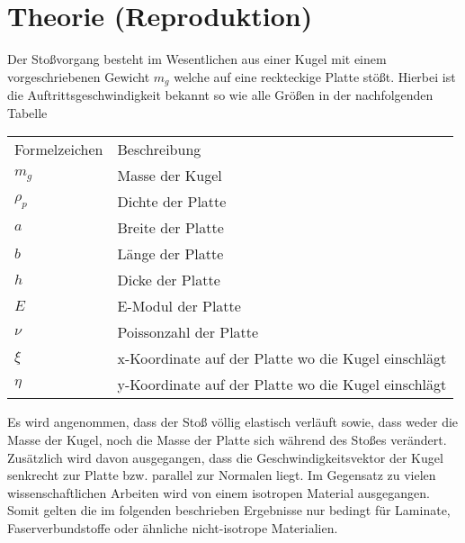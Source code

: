 \chapter{Theorie (Reproduktion)}
\label{chap:Principles}

Der Stoßvorgang besteht im Wesentlichen aus einer Kugel mit einem vorgeschriebenen Gewicht $m_g$ welche auf eine reckteckige Platte stößt. Hierbei ist die Auftrittsgeschwindigkeit bekannt so wie alle Größen in der nachfolgenden Tabelle

\begin{center}
\begin{tabular}[h]{l | l}	
	Formelzeichen & Beschreibung \\
	$m_g$ & Masse der Kugel \\
	$\rho_p$ & Dichte der Platte\\
	$a$ & Breite der Platte\\
	$b$ & Länge der Platte\\
	$h$ & Dicke der Platte \\
	$E$ & E-Modul der Platte \\
	$\nu$ & Poissonzahl der Platte \\
	$\xi$ & x-Koordinate auf der Platte wo die Kugel einschlägt \\
	$\eta$ & y-Koordinate auf der Platte wo die Kugel einschlägt \\
\end{tabular}
\end{center}

Es wird angenommen, dass der Stoß völlig elastisch verläuft sowie, dass weder die Masse der Kugel, noch die Masse der Platte sich während des Stoßes verändert.
Zusätzlich wird davon ausgegangen, dass die Geschwindigkeitsvektor der Kugel senkrecht zur Platte bzw. parallel zur Normalen liegt. Im Gegensatz zu vielen wissenschaftlichen Arbeiten wird von einem isotropen Material ausgegangen. Somit gelten die im folgenden beschrieben Ergebnisse nur bedingt für Laminate, Faserverbundstoffe oder ähnliche nicht-isotrope Materialien. 


